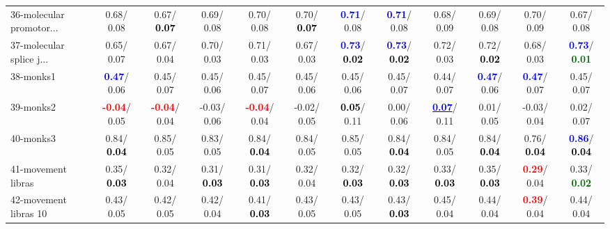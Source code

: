 \begin{table}[h]
\begin{center}
{\begin{tabular}{lc|c|c|c|c|c|c|c|c|c|c}
36-molecular promotor... &   0.68/  0.08 &   0.67/\textcolor{black}{\textbf{  0.07}} &   0.69/  0.08 &   0.70/  0.08 &   0.70/\textcolor{black}{\textbf{  0.07}} & \textcolor{blue}{\textbf{  0.71}}/  0.08 & \textcolor{blue}{\textbf{  0.71}}/  0.08 &   0.68/  0.09 &   0.69/  0.08 &   0.70/  0.09 &   0.67/  0.08 \\
37-molecular splice j... &   0.65/  0.07 &   0.67/  0.04 &   0.70/  0.03 &   0.71/  0.03 &   0.67/  0.03 & \textcolor{blue}{\textbf{  0.73}}/\textcolor{black}{\textbf{  0.02}} & \textcolor{blue}{\textbf{  0.73}}/\textcolor{black}{\textbf{  0.02}} &   0.72/  0.03 &   0.72/\textcolor{black}{\textbf{  0.02}} &   0.68/  0.03 & \textcolor{blue}{\textbf{  0.73}}/\textcolor{darkgreen}{\textbf{  0.01}} \\
38-monks1 & \textcolor{blue}{\textbf{  0.47}}/  0.06 &   0.45/  0.07 &   0.45/  0.06 &   0.45/  0.07 &   0.45/  0.06 &   0.45/  0.06 &   0.45/  0.07 &   0.44/  0.07 & \textcolor{blue}{\textbf{  0.47}}/  0.06 & \textcolor{blue}{\textbf{  0.47}}/  0.07 &   0.45/  0.07 \\
39-monks2 & \textcolor{red}{\textbf{ -0.04}}/  0.05 & \textcolor{red}{\textbf{ -0.04}}/  0.04 &  -0.03/  0.06 & \textcolor{red}{\textbf{ -0.04}}/  0.04 &  -0.02/  0.05 & \textcolor{black}{\textbf{  0.05}}/  0.11 &   0.00/  0.06 & \underline{\textcolor{blue}{\textbf{  0.07}}}/  0.11 &   0.01/  0.05 &  -0.03/  0.04 &   0.02/  0.07 \\ \hline
40-monks3 &   0.84/\textcolor{black}{\textbf{  0.04}} &   0.85/  0.05 &   0.83/  0.05 &   0.84/\textcolor{black}{\textbf{  0.04}} &   0.84/  0.05 &   0.85/  0.05 &   0.84/\textcolor{black}{\textbf{  0.04}} &   0.84/  0.05 &   0.84/\textcolor{black}{\textbf{  0.04}} &   0.76/\textcolor{black}{\textbf{  0.04}} & \textcolor{blue}{\textbf{  0.86}}/\textcolor{black}{\textbf{  0.04}} \\
41-movement libras &   0.35/\textcolor{black}{\textbf{  0.03}} &   0.32/  0.04 &   0.31/\textcolor{black}{\textbf{  0.03}} &   0.31/\textcolor{black}{\textbf{  0.03}} &   0.32/  0.04 &   0.32/\textcolor{black}{\textbf{  0.03}} &   0.32/\textcolor{black}{\textbf{  0.03}} &   0.33/\textcolor{black}{\textbf{  0.03}} &   0.35/\textcolor{black}{\textbf{  0.03}} & \textcolor{red}{\textbf{  0.29}}/  0.04 &   0.33/\textcolor{darkgreen}{\textbf{  0.02}} \\
42-movement libras 10 &   0.43/  0.05 &   0.42/  0.05 &   0.42/  0.04 &   0.41/\textcolor{black}{\textbf{  0.03}} &   0.43/  0.05 &   0.43/  0.05 &   0.43/\textcolor{black}{\textbf{  0.03}} &   0.45/  0.04 &   0.44/  0.04 & \textcolor{red}{\textbf{  0.39}}/  0.04 &   0.44/  0.04 \\

\end{tabular}}
\end{center}
\end{table}
